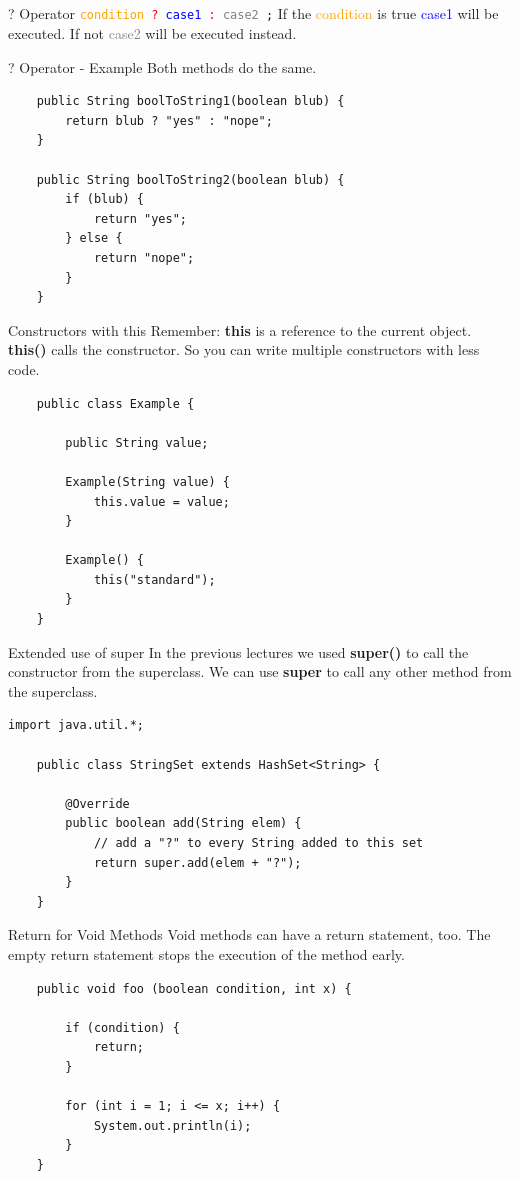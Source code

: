\subsection{}
\begin{frame}{? Operator}
	\texttt{\textcolor{orange}{condition} \textcolor{red}{?} \textcolor{blue}{case1} 
		\textcolor{red}{:} \textcolor{gray}{case2} ;}
	\vfill
	If the \textcolor{orange}{condition} is true \textcolor{blue}{case1} will be executed.
	If not \textcolor{gray}{case2} will be executed instead.
\end{frame}
\begin{frame}[fragile]{? Operator - Example}
	Both methods do the same.
	\vfill
	\begin{lstlisting}
	public String boolToString1(boolean blub) {
	    return blub ? "yes" : "nope";
	}
	
	public String boolToString2(boolean blub) {
	    if (blub) {
	        return "yes";
	    } else { 
	        return "nope";
	    }
	}
	\end{lstlisting}
\end{frame}
\begin{frame}[fragile]{Constructors with this}
	Remember: \textbf{this} is a reference to the current object.
	\vfill
	\textbf{this()} calls the constructor. 
	So you can write multiple constructors with less code.
	\begin{lstlisting}
	public class Example {
	
	    public String value;
	
	    Example(String value) {
	        this.value = value;
	    }
	
	    Example() {
	        this("standard");	    
	    }
	}
	\end{lstlisting}
\end{frame}

\begin{frame}[fragile]{Extended use of super}
	In the previous lectures we used \textbf{super()} to call the constructor from the superclass.
	We can use \textbf{super} to call any other method from the superclass.
	\begin{lstlisting}[escapechar=!]
	import java.util.*;

	public class StringSet extends HashSet<String> {
	
	    @Override
	    public boolean add(String elem) {
	        // add a "?" to every String added to this set
	        return super.add(elem + "?");
	    }
	}
	\end{lstlisting}
\end{frame}

\begin{frame}[fragile]{Return for Void Methods}
	Void methods can have a return statement, too. 
	The empty return statement stops the execution of the method early.
	\begin{lstlisting}
	public void foo (boolean condition, int x) {
	
	    if (condition) {
	        return;
	    }
	    
	    for (int i = 1; i <= x; i++) {
	        System.out.println(i);
	    }
	}
	\end{lstlisting}
\end{frame}


